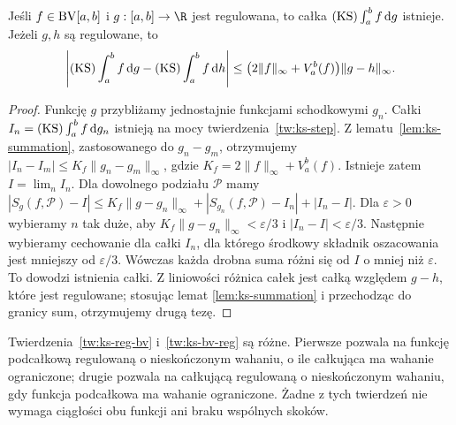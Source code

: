 \begin{twierdzenie}
\label{tw:ks-bv-reg}
Jeśli $f\in\mathrm{BV}[a,b]$ i $g:[a,b]\to\R$ jest regulowana, to całka $(\mathrm{KS})\int_a^b f\,\mathrm dg$ istnieje. Jeżeli $g,h$ są regulowane, to
\[
 \left|(\mathrm{KS})\int_a^b f\,\mathrm dg-(\mathrm{KS})\int_a^b f\,\mathrm dh\right|
 \le\bigl(2\|f\|_\infty+V_a^b(f)\bigr)\|g-h\|_\infty.
\]
\end{twierdzenie}
\begin{proof}
Funkcję $g$ przybliżamy jednostajnie funkcjami schodkowymi $g_n$. Całki $I_n=(\mathrm{KS})\int_a^b f\,\mathrm dg_n$ istnieją na mocy twierdzenia~\ref{tw:ks-step}. Z lematu~\ref{lem:ks-summation}, zastosowanego do $g_n-g_m$, otrzymujemy $|I_n-I_m|\le K_f\|g_n-g_m\|_\infty$, gdzie $K_f=2\|f\|_\infty+V_a^b(f)$. Istnieje zatem $I=\lim_nI_n$. Dla dowolnego podziału $\mathcal P$ mamy
$|S_g(f,\mathcal P)-I|\le K_f\|g-g_n\|_\infty+|S_{g_n}(f,\mathcal P)-I_n|+|I_n-I|$. Dla $\varepsilon>0$ wybieramy $n$ tak duże, aby $K_f\|g-g_n\|_\infty<\varepsilon/3$ i $|I_n-I|<\varepsilon/3$. Następnie wybieramy cechowanie dla całki $I_n$, dla którego środkowy składnik oszacowania jest mniejszy od $\varepsilon/3$. Wówczas każda drobna suma różni się od $I$ o mniej niż $\varepsilon$. To dowodzi istnienia całki. Z liniowości różnica całek jest całką względem $g-h$, które jest regulowane; stosując lemat \ref{lem:ks-summation} i przechodząc do granicy sum, otrzymujemy drugą tezę.
\end{proof}

\begin{uwaga}
Twierdzenia~\ref{tw:ks-reg-bv} i~\ref{tw:ks-bv-reg} są różne. Pierwsze pozwala na funkcję podcałkową regulowaną o nieskończonym wahaniu, o ile całkująca ma wahanie ograniczone; drugie pozwala na całkującą regulowaną o nieskończonym wahaniu, gdy funkcja podcałkowa ma wahanie ograniczone. Żadne z tych twierdzeń nie wymaga ciągłości obu funkcji ani braku wspólnych skoków.
\end{uwaga}

